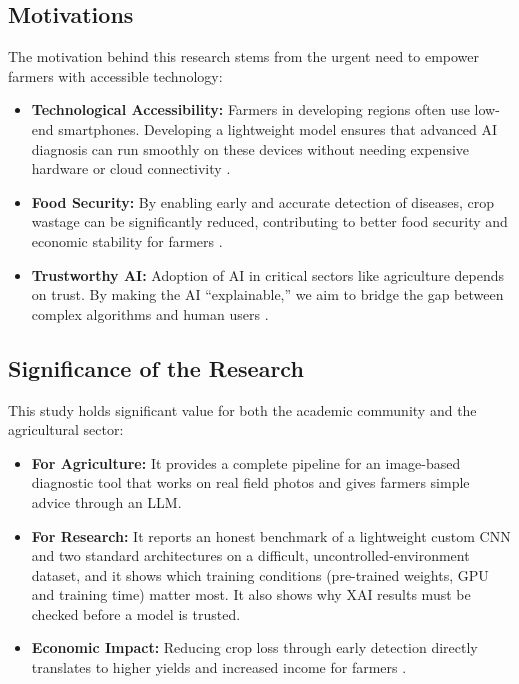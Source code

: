 \subsection{Motivations}
The motivation behind this research stems from the urgent need to empower farmers with accessible technology:
\begin{itemize}
    \item \textbf{Technological Accessibility:} Farmers in developing regions often use low-end smartphones. Developing a lightweight model ensures that advanced AI diagnosis can run smoothly on these devices without needing expensive hardware or cloud connectivity \cite{hinton2012deep}.
    \item \textbf{Food Security:} By enabling early and accurate detection of diseases, crop wastage can be significantly reduced, contributing to better food security and economic stability for farmers \cite{fao2017future, savary2019global}.
    \item \textbf{Trustworthy AI:} Adoption of AI in critical sectors like agriculture depends on trust. By making the AI ``explainable,'' we aim to bridge the gap between complex algorithms and human users \cite{todros2022explainable}.
\end{itemize}

\subsection{Significance of the Research}
This study holds significant value for both the academic community and the agricultural sector:
\begin{itemize}
    \item \textbf{For Agriculture:} It provides a complete pipeline for an image-based diagnostic tool that works on real field photos and gives farmers simple advice through an LLM.
    \item \textbf{For Research:} It reports an honest benchmark of a lightweight custom CNN and two standard architectures on a difficult, uncontrolled-environment dataset, and it shows which training conditions (pre-trained weights, GPU and training time) matter most. It also shows why XAI results must be checked before a model is trusted.
    \item \textbf{Economic Impact:} Reducing crop loss through early detection directly translates to higher yields and increased income for farmers \cite{strange2005plant}.
\end{itemize}

